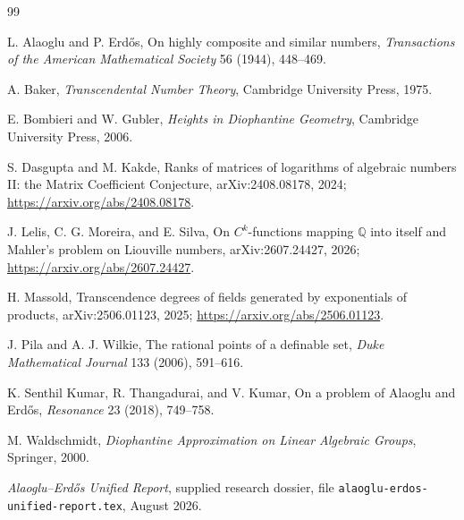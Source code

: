 \documentclass[11pt]{article}
\theoremstyle{definition}
\theoremstyle{remark}
\begin{document}
\begin{thebibliography}{99}

L. Alaoglu and P. Erd\H{o}s,
\newblock On highly composite and similar numbers,
\newblock \emph{Transactions of the American Mathematical Society} 56 (1944), 448--469.

A. Baker,
\newblock \emph{Transcendental Number Theory},
\newblock Cambridge University Press, 1975.

E. Bombieri and W. Gubler,
\newblock \emph{Heights in Diophantine Geometry},
\newblock Cambridge University Press, 2006.

S. Dasgupta and M. Kakde,
\newblock Ranks of matrices of logarithms of algebraic numbers II: the Matrix Coefficient
Conjecture,
\newblock arXiv:2408.08178, 2024;
\newblock \url{https://arxiv.org/abs/2408.08178}.

J. Lelis, C. G. Moreira, and E. Silva,
\newblock On $C^k$-functions mapping $\mathbb Q$ into itself and Mahler's problem on
Liouville numbers,
\newblock arXiv:2607.24427, 2026;
\newblock \url{https://arxiv.org/abs/2607.24427}.

H. Massold,
\newblock Transcendence degrees of fields generated by exponentials of products,
\newblock arXiv:2506.01123, 2025;
\newblock \url{https://arxiv.org/abs/2506.01123}.

J. Pila and A. J. Wilkie,
\newblock The rational points of a definable set,
\newblock \emph{Duke Mathematical Journal} 133 (2006), 591--616.

K. Senthil Kumar, R. Thangadurai, and V. Kumar,
\newblock On a problem of Alaoglu and Erd\H{o}s,
\newblock \emph{Resonance} 23 (2018), 749--758.

M. Waldschmidt,
\newblock \emph{Diophantine Approximation on Linear Algebraic Groups},
\newblock Springer, 2000.

\newblock \emph{Alaoglu--Erd\H{o}s Unified Report},
\newblock supplied research dossier,
\newblock file \texttt{alaoglu-erdos-unified-report.tex}, August 2026.

\end{thebibliography}
\end{document}
